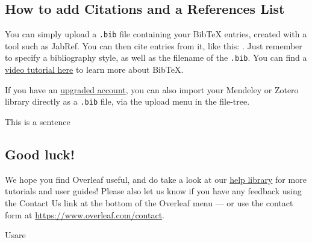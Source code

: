 \documentclass{article}
\begin{document}
\subsection{How to add Citations and a References List}

You can simply upload a \verb|.bib| file containing your BibTeX entries, created with a tool such as JabRef. You can then cite entries from it, like this: \cite{greenwade93}. Just remember to specify a bibliography style, as well as the filename of the \verb|.bib|. You can find a \href{https://www.overleaf.com/help/97-how-to-include-a-bibliography-using-bibtex}{video tutorial here} to learn more about BibTeX.

If you have an \href{https://www.overleaf.com/user/subscription/plans}{upgraded account}, you can also import your Mendeley or Zotero library directly as a \verb|.bib| file, via the upload menu in the file-tree.


This is a sentence


\subsection{Good luck!}

We hope you find Overleaf useful, and do take a look at our \href{https://www.overleaf.com/learn}{help library} for more tutorials and user guides! Please also let us know if you have any feedback using the Contact Us link at the bottom of the Overleaf menu --- or use the contact form at \url{https://www.overleaf.com/contact}.

Usare \cite{adv}

\end{document}
